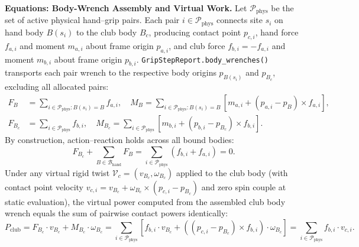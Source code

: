 \documentclass[11pt,a4paper]{article}
\begin{document}
\textbf{Equations: Body-Wrench Assembly and Virtual Work.} Let $\mathcal{P}_{\mathrm{phys}}$ be the set of active physical
hand--grip pairs. Each pair $i \in \mathcal{P}_{\mathrm{phys}}$ connects site $s_i$ on hand body $B(s_i)$ to the club body $B_c$,
producing contact point $p_{c,i}$, hand force $f_{a,i}$ and moment $m_{a,i}$ about frame origin $p_{a,i}$, and club force
$f_{b,i} = -f_{a,i}$ and moment $m_{b,i}$ about frame origin $p_{b,i}$. \texttt{GripStepReport.body\_wrenches()} transports
each pair wrench to the respective body origins $p_{B(s_i)}$ and $p_{B_c}$, excluding all allocated pairs:
\begin{align}
F_{B} &= \sum_{i \in \mathcal{P}_{\mathrm{phys}} : B(s_i) = B} f_{a,i}, \quad
M_{B} = \sum_{i \in \mathcal{P}_{\mathrm{phys}} : B(s_i) = B} \left[ m_{a,i} + (p_{a,i} - p_{B}) \times f_{a,i} \right], \\
F_{B_c} &= \sum_{i \in \mathcal{P}_{\mathrm{phys}}} f_{b,i}, \quad
M_{B_c} = \sum_{i \in \mathcal{P}_{\mathrm{phys}}} \left[ m_{b,i} + (p_{b,i} - p_{B_c}) \times f_{b,i} \right].
\end{align}
By construction, action--reaction holds across all bound bodies:
\begin{equation}
F_{B_c} + \sum_{B \in \mathcal{B}_{\mathrm{hand}}} F_{B} = \sum_{i \in \mathcal{P}_{\mathrm{phys}}} (f_{b,i} + f_{a,i}) = 0.
\end{equation}
Under any virtual rigid twist $\mathcal{V}_c = (v_{B_c}, \omega_{B_c})$ applied to the club body (with contact point velocity
$v_{c,i} = v_{B_c} + \omega_{B_c} \times (p_{c,i} - p_{B_c})$ and zero spin couple at static evaluation), the virtual power
computed from the assembled club body wrench equals the sum of pairwise contact powers identically:
\begin{equation}
P_{\mathrm{club}} = F_{B_c} \cdot v_{B_c} + M_{B_c} \cdot \omega_{B_c}
= \sum_{i \in \mathcal{P}_{\mathrm{phys}}} \left[ f_{b,i} \cdot v_{B_c} + \left((p_{c,i} - p_{B_c}) \times f_{b,i}\right) \cdot \omega_{B_c} \right]
= \sum_{i \in \mathcal{P}_{\mathrm{phys}}} f_{b,i} \cdot v_{c,i}.
\end{equation}
\end{document}
